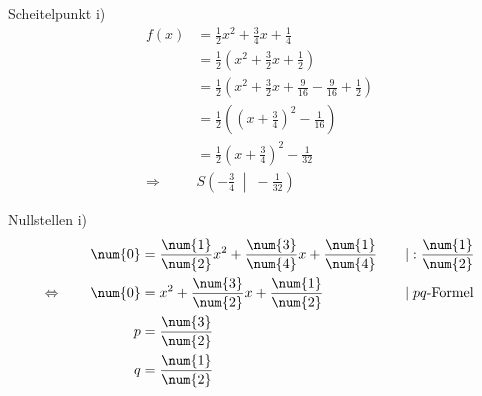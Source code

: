 \begin{exercise}
\begin{minipage}[t]{0.49\linewidth}
    \end{minipage}\bigskip\par
    \begin{minipage}[t]{0.49\linewidth}
      Scheitelpunkt i)
      \small
      \begin{equation*}
        \begin{split}
          f(x)&=\frac{1}{2}x^2+\frac{3}{4}x+\frac{1}{4}
          \\[1ex]
          &=\frac{1}{2}\left(x^2+\frac{3}{2}x+\frac{1}{2}\right)
          \\[1ex]
          &=\frac{1}{2}\left(x^2+\frac{3}{2}x+\frac{9}{16}-\frac{9}{16}+\frac{1}{2}\right)
          \\[1ex]
          &=\frac{1}{2}\left(\left(x+\frac{3}{4}\right)^2-\frac{1}{16}\right)
          \\[1ex]
          &=\frac{1}{2}\left(x+\frac{3}{4}\right)^2-\frac{1}{32}
          \\[2ex]
          \Rightarrow\quad&S\left(-\frac{3}{4}\;\middle|\;-\frac{1}{32}\right)
        \end{split}
      \end{equation*}
    \end{minipage}%
    \hfill
    \begin{minipage}[t]{0.49\linewidth}
      Nullstellen i)
      \small
      \begingroup
        \newcommand{\vstrut}{\vphantom{\left(f_0^0\right)}}%
        \newcommand{\noeq}{\phantom{\Leftrightarrow}\vstrut&\quad}%
        \newcommand{\iseq}{\Leftrightarrow\vstrut&\quad}%
        \newcommand{\impl}{\Rightarrow\vstrut&\quad}%
        \newcommand{\nomod}{\quad&\phantom{|}}%
        \newcommand{\domod}[1]{\quad&|#1}%
        \begin{alignat*}{3}
          \noeq
          &
          \num{0}&=\frac{\num{1}}{\num{2}}x^{2}+\frac{\num{3}}{\num{4}}x+\frac{\num{1}}{\num{4}}
          &
          \domod{:\frac{\num{1}}{\num{2}}}
          \\
          \iseq
          &
          \num{0}&=x^{2}+\frac{\num{3}}{\num{2}}x+\frac{\num{1}}{\num{2}}
          &
          \domod{\;\text{$pq$-Formel}}
          \\
          \noeq
          &
          p&=\frac{\num{3}}{\num{2}}
          &
          \nomod
          \\
          \noeq
          &
          q&=\frac{\num{1}}{\num{2}}
          &
          \nomod
          \\
          \noeq

\end{alignat*}
\end{minipage}
\end{exercise}
